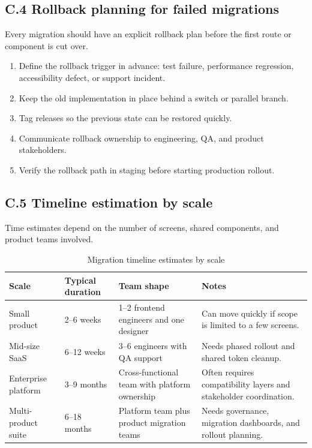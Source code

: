 \subsection*{C.4 Rollback planning for failed migrations}
Every migration should have an explicit rollback plan before the first route or component is cut over.

\begin{enumerate}[leftmargin=*, itemsep=0.35em]
  \item Define the rollback trigger in advance: test failure, performance regression, accessibility defect, or support incident.
  \item Keep the old implementation in place behind a switch or parallel branch.
  \item Tag releases so the previous state can be restored quickly.
  \item Communicate rollback ownership to engineering, QA, and product stakeholders.
  \item Verify the rollback path in staging before starting production rollout.
\end{enumerate}

\subsection*{C.5 Timeline estimation by scale}
Time estimates depend on the number of screens, shared components, and product teams involved.

\begin{table}[htbp]
  \centering
  \caption{Migration timeline estimates by scale}
  \begin{tabularx}{\textwidth}{@{}p{}p{}p{}Y@{}}
    \toprule
    \textbf{Scale} & \textbf{Typical duration} & \textbf{Team shape} & \textbf{Notes} \\
    \midrule
    Small product & 2--6 weeks & 1--2 frontend engineers and one designer & Can move quickly if scope is limited to a few screens. \\
    Mid-size SaaS & 6--12 weeks & 3--6 engineers with QA support & Needs phased rollout and shared token cleanup. \\
    Enterprise platform & 3--9 months & Cross-functional team with platform ownership & Often requires compatibility layers and stakeholder coordination. \\
    Multi-product suite & 6--18 months & Platform team plus product migration teams & Needs governance, migration dashboards, and rollout planning. \\
    \bottomrule
  \end{tabularx}
\end{table}

